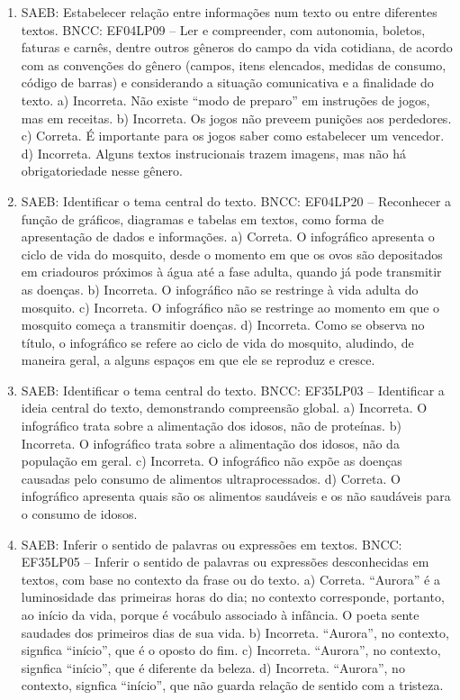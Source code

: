 \begin{enumerate}
\item
SAEB: Estabelecer relação entre informações num texto ou entre diferentes textos. BNCC: EF04LP09 -- Ler e compreender, com autonomia, boletos, faturas e carnês, dentre outros gêneros do campo da vida cotidiana, de acordo com as convenções do gênero (campos, itens elencados, medidas de consumo, código de barras) e considerando a situação comunicativa e a finalidade do texto. a) Incorreta. Não existe ``modo de preparo'' em instruções de jogos, mas em receitas. b) Incorreta. Os jogos não preveem punições aos perdedores. c) Correta. É importante para os jogos saber como estabelecer um vencedor. d) Incorreta. Alguns textos instrucionais trazem imagens, mas não há obrigatoriedade nesse gênero.

\item
SAEB: Identificar o tema central do texto. BNCC: EF04LP20 -- Reconhecer a função de gráficos, diagramas e tabelas em textos, como forma de apresentação de dados e informações. a) Correta. O infográfico apresenta o ciclo de vida do mosquito, desde o momento em que os ovos são depositados em criadouros próximos à água até a fase adulta, quando já pode transmitir as doenças. b) Incorreta. O infográfico não se restringe à vida adulta do mosquito. c)  Incorreta. O infográfico não se restringe ao momento em que o mosquito começa a transmitir doenças. d)  Incorreta. Como se observa no título, o infográfico se refere ao ciclo de vida do mosquito, aludindo, de maneira geral, a alguns espaços em que ele se reproduz e cresce.

\item
SAEB: Identificar o tema central do texto. BNCC: EF35LP03 -- Identificar a ideia central do texto, demonstrando compreensão global. a) Incorreta. O infográfico trata sobre a alimentação dos idosos, não de proteínas. b) Incorreta. O infográfico trata sobre a alimentação dos idosos, não da população em geral. c) Incorreta. O infográfico não expõe as doenças causadas pelo consumo de alimentos ultraprocessados. d) Correta. O infográfico apresenta quais são os alimentos saudáveis e os não saudáveis para o consumo de idosos.

\item
SAEB: Inferir o sentido de palavras ou expressões em textos. BNCC: EF35LP05 -- Inferir o sentido de palavras ou expressões desconhecidas em textos, com base no contexto da frase ou do texto. a) Correta. ``Aurora'' é a luminosidade das primeiras horas do dia; no contexto corresponde, portanto, ao início da vida, porque é vocábulo associado à infância. O poeta sente saudades dos primeiros dias de sua vida. b) Incorreta. ``Aurora'', no contexto, signfica ``início'', que é o oposto do fim. c) Incorreta.  ``Aurora'', no contexto, signfica ``início'', que é diferente da beleza. d) Incorreta. ``Aurora'', no contexto, signfica ``início'', que não guarda relação de sentido com a tristeza.


\end{enumerate}
